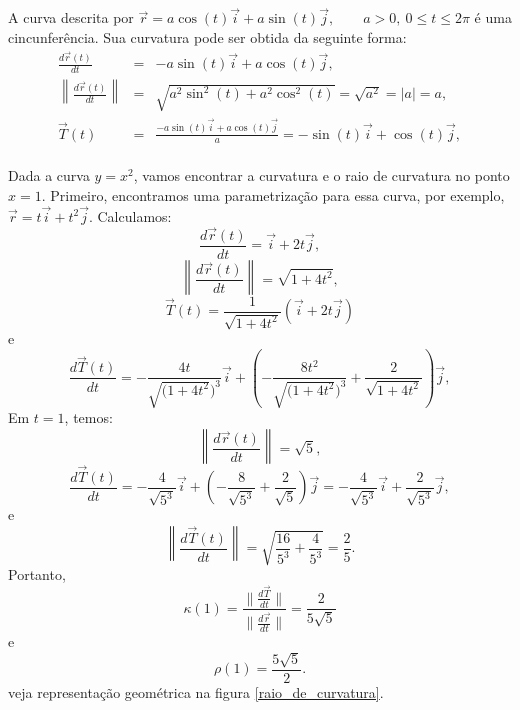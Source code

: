 \begin{ex}A curva descrita por $\vec{r}=a\cos(t)\vec{i}+a\sin(t)\vec{j},\qquad a>0,\ 0\leq t\leq 2\pi$ é uma cincunferência. Sua curvatura pode ser obtida da seguinte forma:
\begin{eqnarray}
\frac{d \vec{r}(t)}{dt}&=&-a\sin(t)\vec{i}+a\cos(t)\vec{j},\\
\left\|\frac{d\vec{r}(t)}{dt}\right\|&=&\sqrt{a^2\sin^2(t)+a^2\cos^2(t)}=\sqrt{a^2}=|a|=a,\\
 \vec{T}(t)&=&\frac{-a\sin(t)\vec{i}+a\cos(t)\vec{j}}{a}=-\sin(t)\vec{i}+\cos(t)\vec{j},\\
\end{eqnarray}

\end{ex}
\begin{ex}Dada a curva $y=x^2$, vamos encontrar a curvatura e o raio de curvatura no ponto $x=1$. Primeiro, encontramos uma parametrização para essa curva, por exemplo, $\vec{r}=t\vec{i}+t^2\vec{j}$. Calculamos:
$$
\frac{d\vec{r}(t)}{dt}=\vec{i}+2t\vec{j},
$$
$$
\left\|\frac{d\vec{r}(t)}{dt}\right\|=\sqrt{1+4t^2},
$$
$$
\vec{T}(t)=\frac{1}{\sqrt{1+4t^2}}\left(\vec{i}+2t\vec{j}\right)
$$
e
$$
\frac{d\vec{T}(t)}{dt}=-\frac{4t}{\sqrt{(1+4t^2})^3}\vec{i}+\left(-\frac{8t^2}{\sqrt{(1+4t^2})^3}+\frac{2}{\sqrt{1+4t^2}}\right)\vec{j},
$$
Em $t=1$, temos:
$$
\left\|\frac{d\vec{r}(t)}{dt}\right\|=\sqrt{5},
$$
$$
\frac{d\vec{T}(t)}{dt}=-\frac{4}{\sqrt{5^3}}\vec{i}+\left(-\frac{8}{\sqrt{5^3}}+\frac{2}{\sqrt{5}}\right)\vec{j}=-\frac{4}{\sqrt{5^3}}\vec{i}+\frac{2}{\sqrt{5^3}}\vec{j},
$$
e
$$
\left\|\frac{d\vec{T}(t)}{dt}\right\|=\sqrt{\frac{16}{5^3}+\frac{4}{5^3}}=\frac{2}{5}.
$$
Portanto,
$$
\kappa(1)=\frac{\|\frac{d\vec{T}}{dt}\|}{\|\frac{d\vec{r}}{dt}\|}=\frac{2}{5\sqrt{5}}
$$
e
$$
\rho(1)=\frac{5\sqrt{5}}{2}.
$$
veja representação geométrica na figura \ref{raio_de_curvatura}.
\end{ex}

